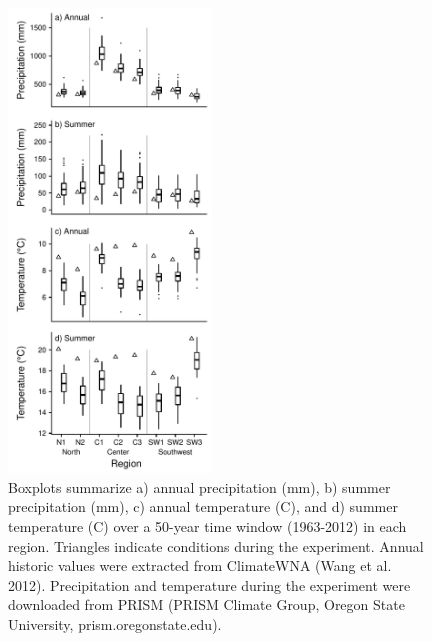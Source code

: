 \documentclass{article}
\begin{document}
\begin{figure}[p]
\centering
\includegraphics[width = 0.48\textwidth]{figs/climate}
\caption{Boxplots summarize a) annual precipitation (mm), b) summer precipitation (mm), c) annual temperature (\textdegree C), and d) summer temperature (\textdegree C) over a 50-year time window (1963-2012) in each region. Triangles indicate conditions during the experiment. Annual historic values were extracted from ClimateWNA (Wang et al. 2012). Precipitation and temperature during the experiment were downloaded from PRISM (PRISM Climate Group, Oregon State University, prism.oregonstate.edu).}
\label{climate}
\end{figure}


\clearpage
\end{document}

